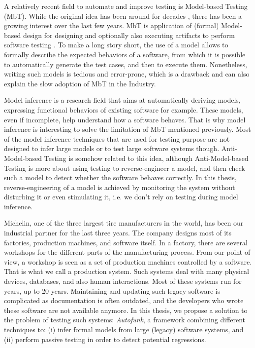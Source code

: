 A relatively recent field to automate and improve testing is
Model-based Testing (MbT). While the original idea has been
around for decades \cite{moore56}, there has been a growing
interest over the last few years.  MbT is application of (formal)
Model-based design for designing and optionally also executing
artifacts to perform software testing
\cite{Jorgensen:1995:STC:526521}. To make a long story short, the
use of a model allows to formally describe the expected behaviors
of a software, from which it is possible to automatically
generate the test cases, and then to execute them.  Nonetheless,
writing such models is tedious and error-prone, which is a
drawback and can also explain the slow adoption of MbT in the
Industry.

Model inference is a research field that aims at automatically
deriving models, expressing functional behaviors of existing
software for example. These models, even if incomplete, help
understand how a software behaves. That is why model inference is
interesting to solve the limitation of MbT mentioned previously.
Most of the model inference techniques that are used for testing
purpose are not designed to infer large models or to test large
software systems though. Anti-Model-based Testing \cite{antimbt} is
somehow related to this idea, although Anti-Model-based Testing
is more about using testing to reverse-engineer a model, and then
check such a model to detect whether the software behaves
correctly. In this thesis, reverse-engineering of a model is
achieved by monitoring the system without disturbing it or even
stimulating it, i.e. we don't rely on testing during model
inference.

Michelin, one of the three largest tire manufacturers in the
world, has been our industrial partner for the last three years.
The company designs most of its factories, production machines,
and software itself. In a factory, there are several workshops
for the different parts of the manufacturing process. From our
point of view, a workshop is seen as a set of production machines
controlled by a software. That is what we call a production
system. Such systems deal with many physical devices, databases,
and also human interactions. Most of these systems run for years,
up to 20 years. Maintaining and updating such legacy software is
complicated as documentation is often outdated, and the
developers who wrote these software are not available anymore.
In this thesis, we propose a solution to the problem of testing
such systems: \textit{Autofunk}, a framework combining different
techniques to: (i) infer formal models from large (legacy)
software systems, and (ii) perform passive testing in order to
detect potential regressions.

